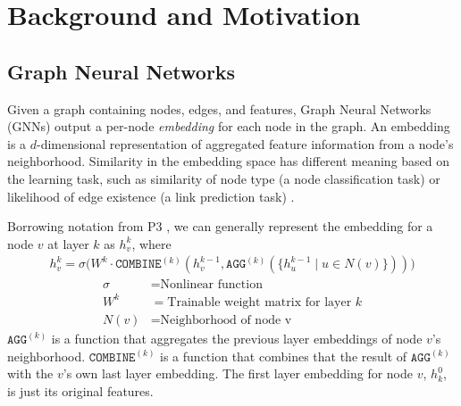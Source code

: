 \chapter{Background and Motivation}

\section{Graph Neural Networks}
Given a graph containing nodes, edges, and features, Graph Neural Networks (GNNs) output a per-node \textit{embedding} for each node in the graph.
An embedding is a $d$-dimensional representation of aggregated feature information from a node's neighborhood. 
Similarity in the embedding space has different meaning based on the learning task, such as similarity of node type (a node classification task) \cite{GCN_2016} or likelihood of edge existence (a link prediction task) \cite{LinkPredictionGNN_2018}. 


Borrowing notation from P3 \cite{P3_2021}, we can generally represent the embedding for a node $v$ at layer $k$ as $h_v^k$, where
\begin{align} \label{GNN Equation}
    h_v^k = \sigma \biggl(
         W^k \cdot 
         \mathtt{COMBINE}^{(k)} \left(
            h_v^{k-1},
            \mathtt{AGG}^{(k)} \left( 
                    \{ h_u^{k-1} \mid u \in N(v) \}
                \right) 
         \right)
     \biggl)
\end{align}
\begin{align*}
    \sigma &= \text{Nonlinear function} \\
    W^k &= \text{Trainable weight matrix for layer $k$} \\
    N(v) &= \text{Neighborhood of node v}
\end{align*}
$\mathtt{AGG}^{(k)}$ is a function that aggregates the previous layer embeddings of node $v$'s neighborhood. 
$\mathtt{COMBINE}^{(k)}$ is a function that combines that the result of $\mathtt{AGG}^{(k)}$ with the $v$'s own last layer embedding. 
The first layer embedding for node $v$, $h_k^0$, is just its original features.

